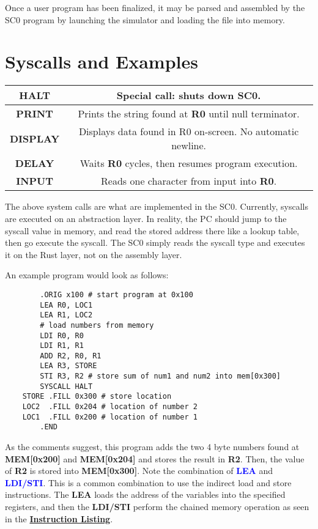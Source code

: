 \documentclass{article}
\begin{document}
\begin{tableofcontents}
\begin{Large}
Once a user program has been finalized, it may be parsed and assembled by the SC0 program by 
launching the simulator and loading the file into memory.
\end{Large}
\section{\Huge Syscalls and Examples}
\begin{center}
\begin{tabular}{|c|c|}
\hline
\textbf{HALT} & Special call: shuts down SC0. \\
\hline
\textbf{PRINT} & Prints the string found at \textbf{R0} until null terminator. \\
\hline
\textbf{DISPLAY} & Displays data found in R0 on-screen. No automatic newline. \\
\hline
\textbf{DELAY} & Waits \textbf{R0} cycles, then resumes program execution. \\
\hline
\textbf{INPUT} & Reads one character from input into \textbf{R0}. \\
\hline
\end{tabular}
\end{center}
The above system calls are what are implemented in the SC0. Currently, syscalls are executed
on an abstraction layer. In reality, the PC should jump to the syscall value in memory, and read 
the stored address there like a lookup table, then go execute the syscall. The SC0 simply
reads the syscall type and executes it on the Rust layer, not on the assembly layer.

An example program would look as follows:
\begin{center}
    \begin{BVerbatim}
        .ORIG x100 # start program at 0x100
        LEA R0, LOC1
        LEA R1, LOC2
        # load numbers from memory
        LDI R0, R0  
        LDI R1, R1
        ADD R2, R0, R1
        LEA R3, STORE
        STI R3, R2 # store sum of num1 and num2 into mem[0x300]
        SYSCALL HALT
    STORE .FILL 0x300 # store location
    LOC2  .FILL 0x204 # location of number 2
    LOC1  .FILL 0x200 # location of number 1
        .END
    \end{BVerbatim}
\end{center}
As the comments suggest, this program adds the two 4 byte numbers found at \textbf{MEM[0x200]}
and \textbf{MEM[0x204]} and stores the result in \textbf{R2}. Then, the value of \textbf{R2}
is stored into \textbf{MEM[0x300]}. Note the combination of \textcolor{blue}{\textbf{LEA}} and
\textcolor{blue}{\textbf{LDI/STI}}. This is a common combination to use the indirect load and
store instructions. The \textbf{LEA} loads the address of the variables into the specified registers,
and then the \textbf{LDI/STI} perform the chained memory operation as seen in the
\textbf{\hyperref[sec:instructionList]{Instruction Listing}}.
\end{tableofcontents}
\end{document}
